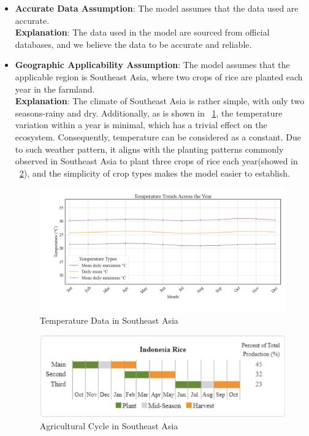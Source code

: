 \documentclass{HZNUMCM}
\begin{document}
      \begin{itemize}
        \item \textbf{Accurate Data Assumption}: The model assumes that the data used are accurate.\\
        \textbf{Explanation}: The data used in the model are sourced from official databases, and we believe the data to be accurate and reliable.
        
        \item \textbf{Geographic Applicability Assumption}: The model assumes that the applicable region is Southeast Asia,
         where two crops of rice are planted each year in the farmland.\\
        \textbf{Explanation}: The climate of Southeast Asia is rather simple, 
        with only two seasons-rainy and dry. Additionally, as is shown in \figurename~\ref{fig:Temperature},
        the temperature variation within a year is minimal, which has a trivial effect on the ecosystem.
        Consequently, temperature can be considered as a constant.
        Due to such weather pattern, it aligns with the planting patterns commonly observed in Southeast Asia to plant three crops of rice each year(showed in \figurename~\ref{fig:PlantMode}),
         and the simplicity of crop types makes the model easier to establish.
        
        \begin{figure}[H]
          \centering
          \includegraphics[width=\linewidth]{images/AverTemper.png}
          \caption{Temperature Data in Southeast Asia\cite{IndoTemper}}
          \label{fig:Temperature}
        \end{figure}

        \begin{figure}[H]
          \centering
          \includegraphics[width=0.75\linewidth]{images/PlantMode.jpg}
          \caption{Agricultural Cycle in Southeast Asia}
          \label{fig:PlantMode}
        \end{figure}


\end{itemize}
\end{document}
